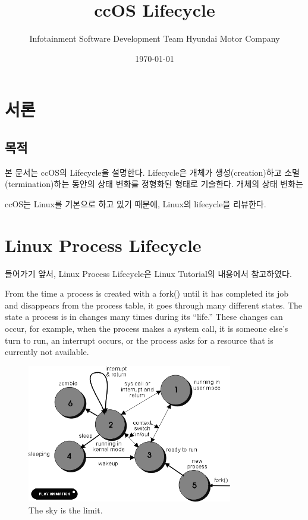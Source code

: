 \documentclass[12pt]{article}
\title{ccOS Lifecycle}
\author{Infotainment Software Development Team \newline Hyundai Motor Company \newline }
\date{\today}
\begin{document}
\maketitle

\tableofcontents

\clearpage
\section{서론}
\subsection{목적}
본 문서는 ccOS의 Lifecycle을 설명한다. Lifecycle은 개체가 생성(creation)하고 소멸(termination)하는 동안의 상태 변화를 정형화된 형태로 기술한다.
개체의 상태 변화는 

ccOS는 Linux를 기본으로 하고 있기 때문에, Linux의 lifecycle을 리뷰한다.



\clearpage
\section{Linux Process Lifecycle}

들어가기 앞서, Linux Process Lifecycle은 Linux Tutorial의 내용에서 참고하였다.

 From the time a process is created with a fork() until it has completed its job and disappears from the process table, it goes through many different states. The state a process is in changes many times during its ``life.'' These changes can occur, for example, when the process makes a system call, it is someone else's turn to run, an interrupt occurs, or the process asks for a resource that is currently not available.

\begin{figure}[!h]
\centering
\includegraphics[width=0.8\textwidth]{fig/procflowc.png}
\caption{The sky is the limit.}
\end{figure}
\end{document}

